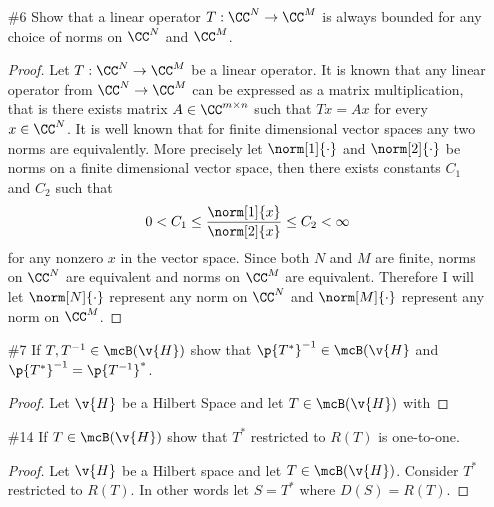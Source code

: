 \documentclass[11pt, oneside]{article}
\begin{document}
\begin{enumerate}
\begin{proof}
      Lastly I will show that $\norm{S} = \norm{T}$.
      Consider the following.
      \begin{align*}
        \norm{S} &= \sup*[x \in \overline{D(T)}]{\frac{\norm[Y]{Sx}}{\norm[X]{x}} \\
      \end{align*}
    \end{proof}

  \pagebreak
  \item[\#6]
    Show that a linear operator $T:\CC^N \to \CC^M$ is always bounded for
    any choice of norms on $\CC^N$ and $\CC^M$.

    \begin{proof}
      Let $T:\CC^N \to \CC^M$ be a linear operator.
      It is known that any linear operator from $\CC^N \to \CC^M$ can be
      expressed as a matrix multiplication, that is there exists matrix
      $A \in \CC^{m \times n}$ such that $Tx = Ax$ for every $x \in \CC^N$.
      It is well known that for finite dimensional vector spaces any two norms
      are equivalently.
      More precisely let $\norm[1]{\cdot}$ and $\norm[2]{\cdot}$ be norms on a
      finite dimensional vector space, then there exists constants $C_1$ and $C_2$ such
      that
      \[
        0 < C_1 \le \frac{\norm[1]{x}}{\norm[2]{x}} \le C_2 < \infty
      \]
      for any nonzero $x$ in the vector space.
      Since both $N$ and $M$ are finite, norms on $\CC^N$ are equivalent
      and norms on $\CC^M$ are equivalent.
      Therefore I will let $\norm[N]{\cdot}$ represent any norm on $\CC^N$ and
      $\norm[M]{\cdot}$ represent any norm on $\CC^M$.
    \end{proof}

  \pagebreak
  \item[\#7]
    If $T, T^{-1} \in \mcB(\v{H})$ show that $\p{T^*}^{-1} \in \mcB(\v{H}$ and
    $\p{T^*}^{-1} = \p{T^{-1}}^*$.

    \begin{proof}
      Let $\v{H}$ be a Hilbert Space and let $T \in \mcB(\v{H})$ with 
    \end{proof}

  \pagebreak
  \item[\#14]
    If $T \in \mcB(\v{H})$ show that $T^*$ restricted to $R(T)$ is one-to-one.

    \begin{proof}
      Let $\v{H}$ be a Hilbert space and let $T \in \mcB(\v{H})$.
      Consider $T^*$ restricted to $R(T)$.
      In other words let $S = T^*$ where $D(S) = R(T)$.
    \end{proof}
\end{enumerate}
\end{document}

